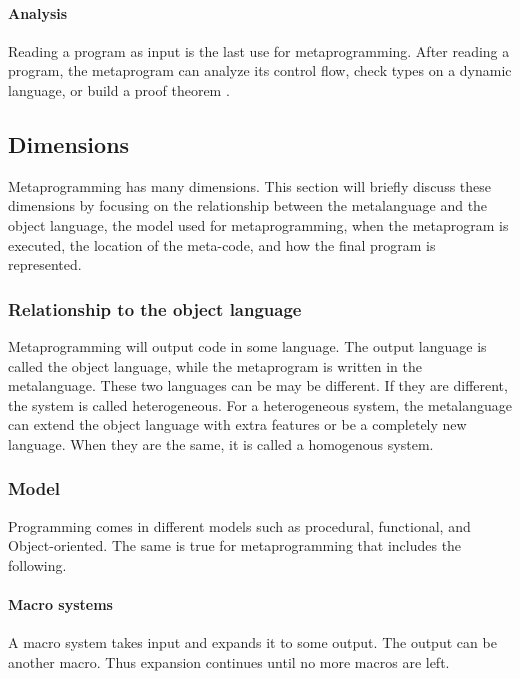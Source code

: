 \paragraph{Analysis}
Reading a program as input is the last use for metaprogramming.
After reading a program, the metaprogram can analyze its control flow, check types on a dynamic language, or build a proof theorem \cite{sheard_01_01}.

\subsection{Dimensions}
Metaprogramming has many dimensions.
This section will briefly discuss these dimensions by focusing on the relationship between the metalanguage and the object language, the model used for metaprogramming, when the metaprogram is executed, the location of the meta-code, and how the final program is represented.

\subsubsection{Relationship to the object language}
Metaprogramming will output code in some language.
The output language is called the object language, while the metaprogram is written in the metalanguage.
These two languages can be may be different.
If they are different, the system is called heterogeneous.
For a heterogeneous system, the metalanguage can extend the object language with extra features or be a completely new language.
When they are the same, it is called a homogenous system. \cite{savidis_19_01, sheard_01_01}


\subsubsection{Model}
Programming comes in different models such as procedural, functional, and Object-oriented.
The same is true for metaprogramming that includes the following.

\paragraph{Macro systems}
A macro system takes input and expands it to some output. \cite{savidis_19_01}
The output can be another macro.
Thus expansion continues until no more macros are left.

